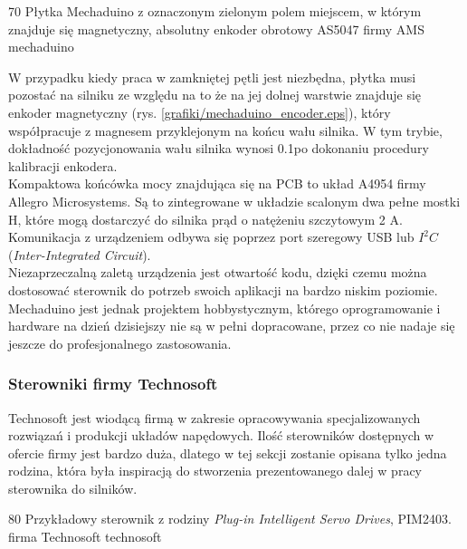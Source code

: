 	{70}
	{Płytka Mechaduino z oznaczonym zielonym polem miejscem, w którym znajduje się magnetyczny, absolutny enkoder obrotowy AS5047 firmy AMS}
	{mechaduino}
	
W przypadku kiedy praca w zamkniętej pętli jest niezbędna, płytka musi pozostać na silniku ze względu na to że na jej dolnej warstwie znajduje się enkoder magnetyczny (rys. \ref{grafiki/mechaduino_encoder.eps}), który współpracuje z magnesem przyklejonym na końcu wału silnika. W tym trybie, dokładność pozycjonowania wału silnika wynosi 0.1\degree po dokonaniu procedury kalibracji enkodera. \\

Kompaktowa końcówka mocy znajdująca się na PCB to układ A4954 firmy Allegro Microsystems. Są to zintegrowane w układzie scalonym dwa pełne mostki H, które mogą dostarczyć do silnika prąd o natężeniu szczytowym 2 A. Komunikacja z urządzeniem odbywa się poprzez port szeregowy USB lub $ I^2C $ ({\it Inter-Integrated Circuit}). \\

Niezaprzeczalną zaletą urządzenia jest otwartość kodu, dzięki czemu można dostosować sterownik do potrzeb swoich aplikacji na bardzo niskim poziomie. Mechaduino jest jednak projektem hobbystycznym, którego oprogramowanie i hardware  na dzień dzisiejszy nie są w pełni dopracowane, przez co nie nadaje się jeszcze do profesjonalnego zastosowania.

\subsubsection{Sterowniki firmy Technosoft}

Technosoft jest wiodącą firmą w zakresie opracowywania specjalizowanych rozwiązań i produkcji układów napędowych. Ilość sterowników dostępnych w ofercie firmy jest bardzo duża, dlatego w tej sekcji zostanie opisana tylko jedna rodzina, która była inspiracją do stworzenia prezentowanego dalej w pracy sterownika do silników.

	{80}
	{Przykładowy sterownik z rodziny {\it Plug-in Intelligent Servo Drives}, PIM2403. firma Technosoft}
	{technosoft}












\clearpage


